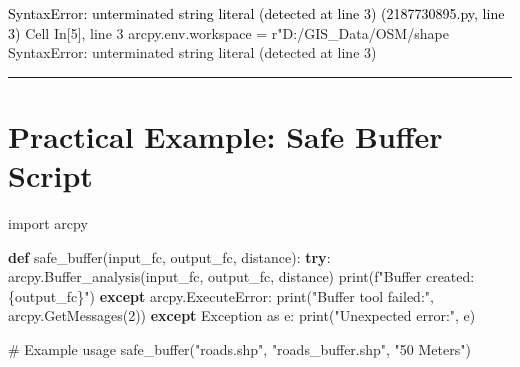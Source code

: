\documentclass[
  11pt,
  letterpaper,
]{book}
\newenvironment{Shaded}{\begin{snugshade}}{\end{snugshade}}
\newcommand{\BuiltInTok}[1]{\textcolor[rgb]{0.00,0.23,0.31}{#1}}
\newcommand{\CommentTok}[1]{\textcolor[rgb]{0.37,0.37,0.37}{#1}}
\newcommand{\ControlFlowTok}[1]{\textcolor[rgb]{0.00,0.23,0.31}{\textbf{#1}}}
\newcommand{\DecValTok}[1]{\textcolor[rgb]{0.68,0.00,0.00}{#1}}
\newcommand{\ImportTok}[1]{\textcolor[rgb]{0.00,0.46,0.62}{#1}}
\newcommand{\KeywordTok}[1]{\textcolor[rgb]{0.00,0.23,0.31}{\textbf{#1}}}
\newcommand{\NormalTok}[1]{\textcolor[rgb]{0.00,0.23,0.31}{#1}}
\newcommand{\PreprocessorTok}[1]{\textcolor[rgb]{0.68,0.00,0.00}{#1}}
\newcommand{\SpecialCharTok}[1]{\textcolor[rgb]{0.37,0.37,0.37}{#1}}
\newcommand{\SpecialStringTok}[1]{\textcolor[rgb]{0.13,0.47,0.30}{#1}}
\newcommand{\StringTok}[1]{\textcolor[rgb]{0.13,0.47,0.30}{#1}}
\begin{document}
\begin{Highlighting}
\textcolor{black}{SyntaxError: unterminated string literal (detected at line 3) (2187730895.py, line 3)}
\textcolor{black}{}\textcolor{QuartoInternalColor15}{  Cell }\textcolor{QuartoInternalColor3}{In[5], line 3}\textcolor{QuartoInternalColor15}{}\textcolor{QuartoInternalColor2}{}
\textcolor{QuartoInternalColor2}{}\textcolor{QuartoInternalColor16}{    arcpy.env.workspace = r"D:/GIS\_Data/OSM/shape}\textcolor{QuartoInternalColor2}{}
\textcolor{QuartoInternalColor2}{}\textcolor{QuartoInternalColor17}{                          \textasciicaret{}}\textcolor{QuartoInternalColor2}{}
\textcolor{QuartoInternalColor2}{}\textcolor{QuartoInternalColor1}{SyntaxError}\textcolor{QuartoInternalColor2}{}\textcolor{QuartoInternalColor1}{:}\textcolor{QuartoInternalColor2}{ unterminated string literal (detected at line 3)}
\end{Highlighting}

\begin{center}\rule{0.5\linewidth}{0.5pt}\end{center}

\section{Practical Example: Safe Buffer
Script}\label{practical-example-safe-buffer-script}

\begin{Shaded}
\begin{Highlighting}[]
\ImportTok{import}\NormalTok{ arcpy}

\KeywordTok{def}\NormalTok{ safe\_buffer(input\_fc, output\_fc, distance):}
    \ControlFlowTok{try}\NormalTok{:}
\NormalTok{        arcpy.Buffer\_analysis(input\_fc, output\_fc, distance)}
        \BuiltInTok{print}\NormalTok{(}\SpecialStringTok{f"Buffer created: }\SpecialCharTok{\{}\NormalTok{output\_fc}\SpecialCharTok{\}}\SpecialStringTok{"}\NormalTok{)}
    \ControlFlowTok{except}\NormalTok{ arcpy.ExecuteError:}
        \BuiltInTok{print}\NormalTok{(}\StringTok{"Buffer tool failed:"}\NormalTok{, arcpy.GetMessages(}\DecValTok{2}\NormalTok{))}
    \ControlFlowTok{except} \PreprocessorTok{Exception} \ImportTok{as}\NormalTok{ e:}
        \BuiltInTok{print}\NormalTok{(}\StringTok{"Unexpected error:"}\NormalTok{, e)}

\CommentTok{\# Example usage}
\NormalTok{safe\_buffer(}\StringTok{"roads.shp"}\NormalTok{, }\StringTok{"roads\_buffer.shp"}\NormalTok{, }\StringTok{"50 Meters"}\NormalTok{)}
\end{Highlighting}
\end{Shaded}
\end{document}
